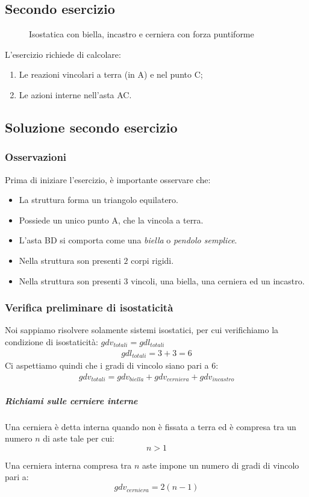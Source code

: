 \documentclass[main.tex]{subfiles}
\begin{document}
\subsection{Secondo esercizio}

\begin{figure}[htb]
\centering
\resizebox{.5\textwidth}{!}{}
\caption{Isostatica con biella, incastro e cerniera con forza puntiforme}
\end{figure}

L'esercizio richiede di calcolare:
\begin{enumerate}
  \item Le reazioni vincolari a terra (in A) e nel punto C;
  \item Le azioni interne nell’asta AC.
\end{enumerate}

\subsection{Soluzione secondo esercizio}
\subsubsection{Osservazioni}
Prima di iniziare l'esercizio, è importante osservare che:
\begin{itemize}
  \item La struttura forma un triangolo equilatero.
  \item Possiede un unico punto A, che la vincola a terra.
  \item L'asta BD si comporta come una \textit{biella} o \textit{pendolo semplice}.
  \item Nella struttura son presenti $2$ corpi rigidi.
  \item Nella struttura son presenti 3 vincoli, una biella, una cerniera ed un incastro.
\end{itemize}
\subsubsection{Verifica preliminare di isostaticità}
Noi sappiamo risolvere solamente sistemi isostatici, per cui verifichiamo la condizione di isostaticità: $gdv_{totali} = gdl_{totali}$
\begin{gather*}
gdl_{totali}= 3 + 3 = 6
\end{gather*}
Ci aspettiamo quindi che i gradi di vincolo siano pari a $6$:
\begin{gather*}
gdv_{totali}= gdv_{biella} + gdv_{cerniera} + gdv_{incastro}
\end{gather*}
\subparagraph{Richiami sulle cerniere interne}
\begin{definition}
Una cerniera è detta interna quando non è fissata a terra ed è compresa tra un numero $n$ di aste tale per cui:
\[ n>1 \]
\end{definition}
\begin{theorem}
Una cerniera interna compresa tra $n$ aste impone un numero di gradi di vincolo pari a:
\[ gdv_{cerniera} = 2(n-1) \]
\end{theorem}
\end{document}

